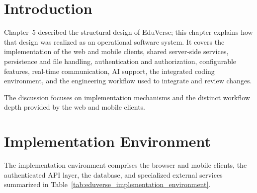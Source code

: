 
\section{Introduction}\label{sec:implementation_introduction}

Chapter~5 described the structural design of EduVerse; this chapter explains
how that design was realized as an operational software system. It covers the
implementation of the web and mobile clients, shared server-side services,
persistence and file handling, authentication and authorization, configurable
features, real-time communication, AI support, the integrated coding
environment, and the engineering workflow used to integrate and review
changes.

The discussion focuses on implementation mechanisms and the distinct workflow
depth provided by the web and mobile clients.

\section{Implementation Environment}
\label{sec:implementation_environment}

The implementation environment comprises the browser and mobile clients, the
authenticated API layer, the database, and specialized external services
summarized in Table~\ref{tab:eduverse_implementation_environment}.

